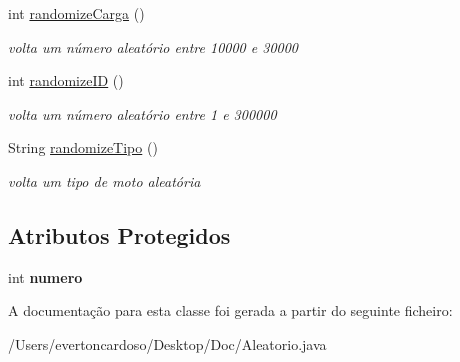 \begin{DoxyCompactItemize}
int \mbox{\hyperlink{class_aleatorio_a2a4832bca1561b9c4b47a28427599607}{randomize\+Carga}} ()
\begin{DoxyCompactList}\small\item\em volta um número aleatório entre 10000 e 30000 \end{DoxyCompactList}\item 
\mbox{\label{class_aleatorio_acbb799a34376c65decd5f3a0956420d6}} 
int \mbox{\hyperlink{class_aleatorio_acbb799a34376c65decd5f3a0956420d6}{randomize\+ID}} ()
\begin{DoxyCompactList}\small\item\em volta um número aleatório entre 1 e 300000 \end{DoxyCompactList}\item 
\mbox{\label{class_aleatorio_aaa35a5ed7a2a6696fadfad7181392fb8}} 
String \mbox{\hyperlink{class_aleatorio_aaa35a5ed7a2a6696fadfad7181392fb8}{randomize\+Tipo}} ()
\begin{DoxyCompactList}\small\item\em volta um tipo de moto aleatória \end{DoxyCompactList}\end{DoxyCompactItemize}
\subsection*{Atributos Protegidos}
\begin{DoxyCompactItemize}
\item 
\mbox{\label{class_aleatorio_acc3b21dccd4a3bea8092b53b53ff1ae7}} 
int {\bfseries numero}
\end{DoxyCompactItemize}


A documentação para esta classe foi gerada a partir do seguinte ficheiro\+:\begin{DoxyCompactItemize}
\item 
/\+Users/evertoncardoso/\+Desktop/\+Doc/Aleatorio.\+java\end{DoxyCompactItemize}
